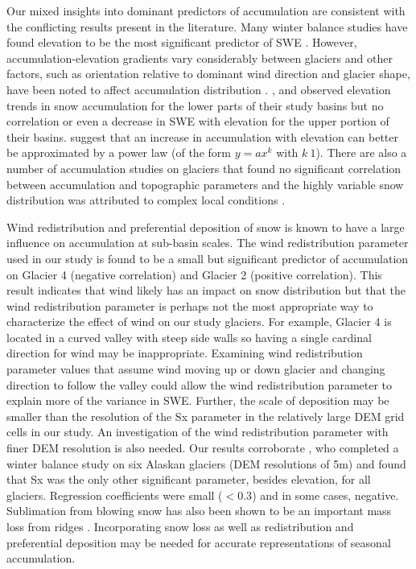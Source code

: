 \documentclass[twocolumn, letterpaper]{igs}
\begin{document}
Our mixed insights into dominant predictors of accumulation are consistent with the conflicting results present in the literature. Many winter balance studies have found elevation to be the most significant predictor of SWE \citep[e.g.][]{Machguth2006, McGrath2015}. However, accumulation-elevation gradients vary considerably between glaciers \citep{Winther1998} and other factors, such as orientation relative to dominant wind direction and glacier shape, have been noted to affect accumulation distribution \citep{Machguth2006,Grabiec2011}.  \cite{Machguth2006}, \cite{Grunewald2014} and \cite{Kirchner2014} observed elevation trends in snow accumulation for the lower parts of their study basins but no correlation or even a decrease in SWE with elevation for the upper portion of their basins. \cite{Helbig2017} suggest that an increase in accumulation with elevation can better be approximated by a power law (of the form $y=ax^k$ with $k\>1$). There are also a number of accumulation studies on glaciers that found no significant correlation between accumulation and topographic parameters and the highly variable snow distribution was attributed to complex local conditions \citep[e.g.][]{Grabiec2011,Lopez2011}.

Wind redistribution and preferential deposition of snow is known to have a large influence on accumulation at sub-basin scales\citep{Dadic2010, Winstral2013}. The wind redistribution parameter used in our study is found to be a small but significant predictor of accumulation on Glacier 4 (negative correlation) and Glacier 2 (positive correlation). This result indicates that wind likely has an impact on snow distribution but that the wind redistribution parameter is perhaps not the most appropriate way to characterize the effect of wind on our study glaciers. For example, Glacier 4 is located in a curved valley with steep side walls so having a single cardinal direction for wind may be inappropriate. Examining wind redistribution parameter values that assume wind moving up or down glacier and changing direction to follow the valley could allow the wind redistribution parameter to explain more of the variance in SWE. Further, the scale of deposition may be smaller than the resolution of the Sx parameter in the relatively large DEM grid cells in our study. An investigation of the wind redistribution parameter with finer DEM resolution is also needed. Our results corroborate \cite{McGrath2015}, who completed a winter balance study on six Alaskan glaciers (DEM resolutions of 5m) and found that Sx was the only other significant parameter, besides elevation, for all glaciers. Regression coefficients were small ($<0.3$) and in some cases, negative. Sublimation from blowing snow has also been shown to be an important mass loss from ridges \citep{Musselman2015}. Incorporating snow loss as well as redistribution and preferential deposition may be needed for accurate representations of seasonal accumulation. 
\end{document}
